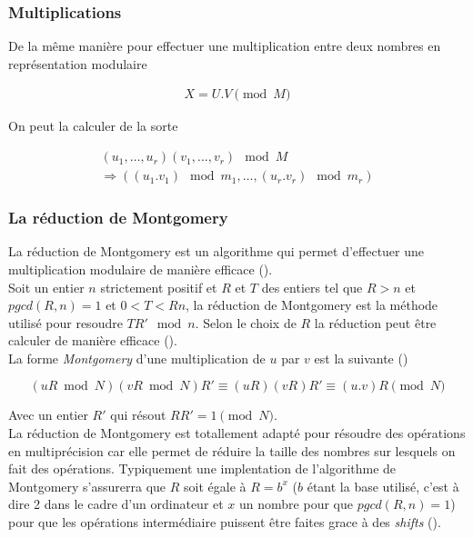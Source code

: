\documentclass[letterpaper]{article}
\begin{document}
\subsubsection{Multiplications}

De la même manière pour effectuer une multiplication entre deux nombres en
représentation modulaire

\begin{equation}
  \begin{split}
    X = U.V \pmod M
  \end{split}
\end{equation}

On peut la calculer de la sorte

\begin{equation}
  \begin{split}
    (u_1, \dots, u_r)  (v_1, \dots, v_r) \mod M \\
      \Rightarrow ((u_1 . v_1) \mod m_1, \dots, (u_r . v_r) \mod m_r)
  \end{split}
\end{equation}

\subsubsection{La réduction de Montgomery}

La réduction de Montgomery est un algorithme qui permet d'effectuer une
multiplication modulaire de manière efficace (\cite{menezes1996crypto}).\\

Soit un entier $n$ strictement positif et $R$ et $T$ des entiers tel que $R >
n$ et $pgcd(R, n) = 1$ et $0 < T < Rn$, la réduction de Montgomery est la
méthode utilisé pour resoudre $T R' \mod n$. Selon le choix de $R$ la
réduction peut être calculer de manière efficace (\cite{menezes1996crypto}).\\

La forme \emph{Montgomery} d'une multiplication de $u$ par $v$ est la
suivante (\cite{wikimontgomery})

$$(uR \bmod N)(vR \bmod N) R' ≡ (uR)(vR) R' ≡ (u.v) R \pmod N$$

Avec un entier $R'$ qui résout $RR' = 1 \pmod N$.\\

La réduction de Montgomery est totallement adapté pour résoudre des opérations
en multiprécision car elle permet de réduire la taille des nombres sur lesquels
on fait des opérations. Typiquement une implentation de l'algorithme de
Montgomery s'assurerra que $R$ soit égale à $R = b^{x}$ ($b$ étant la base
utilisé, c'est à dire 2 dans le cadre d'un ordinateur et $x$ un nombre pour
que $pgcd(R, n) = 1$) pour que les opérations intermédiaire puissent être
faites grace à des \emph{shifts} (\cite{djguan2003montgomery}).
\end{document}
